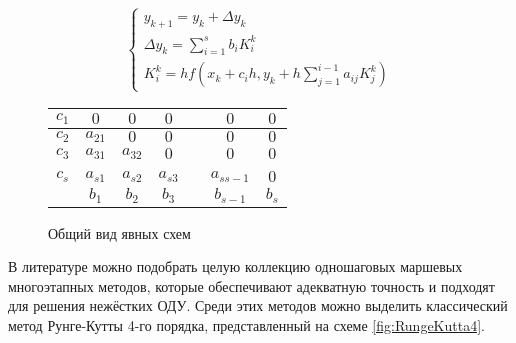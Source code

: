 \begin{figure}
    \begin{minipage}[t]{8.5cm}
        {\small
        \begin{equation*}
            \begin{cases}
                y_{k + 1} = y_k + \Delta y_k\\
                \Delta y_k = \sum\limits_{i = 1}^sb_iK_i^k\\
                K_i^k = hf(x_k + c_ih, y_k + h\sum\limits_{j = 1}^{i - 1}a_{ij}K_j^k)
            \end{cases}
        \end{equation*}
        }
    \end{minipage}
    \begin{minipage}[t]{7.5cm}
        \begin{table}    
            \begin{tabular}{|c|c|c|c|c|c|c|}
            \hline
            $c_1$ & $0$ & $0$ & $0$ & & $0$ & $0$\\
            \hline
            $c_2$ & $a_{21}$ & $0$ & $0$ & & $0$ & $0$\\
            \hline
            $c_3$ & $a_{31}$ & $a_{32}$ & $0$ & & $0$ & $0$\\
            \hline
            & & & & & &\\
            \hline
            $c_s$ & $a_{s1}$ & $a_{s2}$ & $a_{s3}$ & & $a_{ss-1}$ & $0$\\
            \hline
            & \cellcolor{lightgray} $b_1$ & \cellcolor{lightgray} $b_2$ & \cellcolor{lightgray} $b_3$ & \cellcolor{lightgray} & \cellcolor{lightgray} $b_{s-1}$ &  \cellcolor{lightgray} $b_s$\\
            \hline
            \end{tabular}
        \end{table}
    \end{minipage}
    \caption{Общий вид явных схем}
    \label{fig:Runge}
\end{figure}

В литературе можно подобрать целую коллекцию одношаговых маршевых многоэтапных методов, которые обеспечивают адекватную точность и
подходят для решения нежёстких ОДУ. Среди этих методов можно выделить классический метод Рунге-Кутты 4-го порядка, представленный на
схеме \ref{fig:RungeKutta4}.

